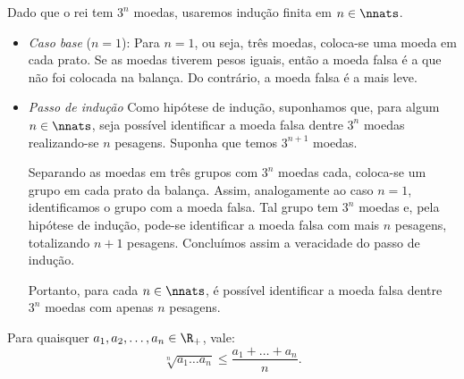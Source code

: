 \begin{solution}
Dado que o rei tem $3^n$ moedas, usaremos indução finita em $n \in \nnats$. 

\begin{itemize}
	\item \textit{Caso base} ($n=1$): Para $n=1$, ou seja, três moedas, coloca-se uma moeda em cada prato. Se as moedas tiverem pesos iguais, então a moeda falsa é a que não foi colocada na balança. Do contrário, a moeda falsa é a mais leve.

	\item \textit{Passo de indução} Como hipótese de indução, suponhamos que, para algum $n \in \nnats$, seja possível identificar a moeda falsa dentre $3^n$ moedas realizando-se $n$ pesagens. Suponha que temos $3^{n+1}$ moedas. 

	Separando as moedas em três grupos com $3^n$ moedas cada, coloca-se um grupo em cada prato da balança. Assim, analogamente ao caso $n = 1$, identificamos o grupo com a moeda falsa. Tal grupo tem $3^n$ moedas e, pela hipótese de indução, pode-se identificar a moeda falsa com mais $n$  pesagens, totalizando $n+1$ pesagens. Concluímos assim a veracidade do passo de indução.

		Portanto, para cada $n \in \nnats$, é possível identificar a moeda falsa dentre $3^n$ moedas com apenas $n$ pesagens.
\end{itemize}
\end{solution}

\begin{theorem}
Para quaisquer $a_1, a_2, \dots , a_n \in \R_+$, vale:
%
\begin{equation*}
    \sqrt[n]{a_1\dots a_n} \le \frac {a_1 + \dots + a_n} n.
\end{equation*}
\end{theorem}

